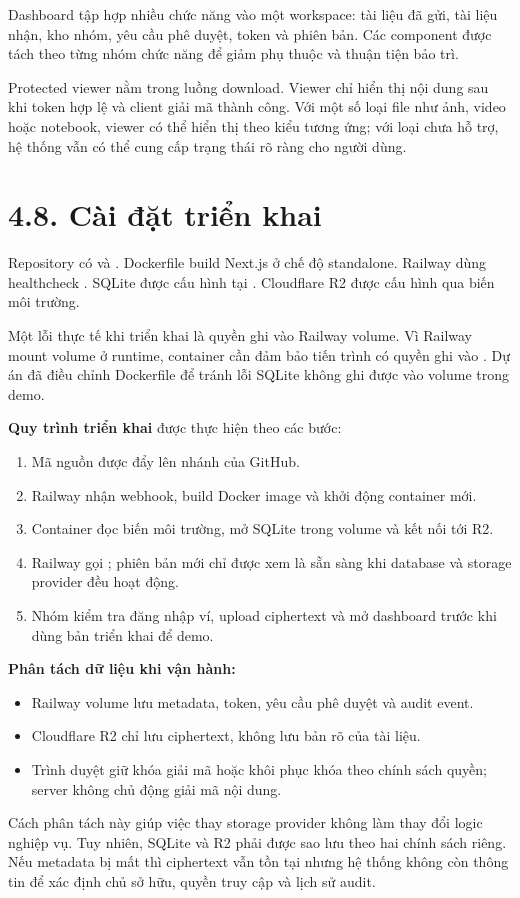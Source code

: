 Dashboard tập hợp nhiều chức năng vào một workspace: tài liệu đã gửi, tài liệu nhận, kho nhóm, yêu cầu phê duyệt, token và phiên bản. Các component được tách theo từng nhóm chức năng để giảm phụ thuộc và thuận tiện bảo trì.

Protected viewer nằm trong luồng download. Viewer chỉ hiển thị nội dung sau khi token hợp lệ và client giải mã thành công. Với một số loại file như ảnh, video hoặc notebook, viewer có thể hiển thị theo kiểu tương ứng; với loại chưa hỗ trợ, hệ thống vẫn có thể cung cấp trạng thái rõ ràng cho người dùng.

\section*{4.8. Cài đặt triển khai}
{}

Repository có  và . Dockerfile build Next.js ở chế độ standalone. Railway dùng healthcheck . SQLite được cấu hình tại . Cloudflare R2 được cấu hình qua biến môi trường.

Một lỗi thực tế khi triển khai là quyền ghi vào Railway volume. Vì Railway mount volume ở runtime, container cần đảm bảo tiến trình có quyền ghi vào . Dự án đã điều chỉnh Dockerfile để tránh lỗi SQLite không ghi được vào volume trong demo.

\textbf{Quy trình triển khai} được thực hiện theo các bước:
\begin{enumerate}
  \item Mã nguồn được đẩy lên nhánh  của GitHub.
  \item Railway nhận webhook, build Docker image và khởi động container mới.
  \item Container đọc biến môi trường, mở SQLite trong volume và kết nối tới R2.
  \item Railway gọi ; phiên bản mới chỉ được xem là sẵn sàng khi database và storage provider đều hoạt động.
  \item Nhóm kiểm tra đăng nhập ví, upload ciphertext và mở dashboard trước khi dùng bản triển khai để demo.
\end{enumerate}

\textbf{Phân tách dữ liệu khi vận hành:}
\begin{itemize}
  \item Railway volume lưu metadata, token, yêu cầu phê duyệt và audit event.
  \item Cloudflare R2 chỉ lưu ciphertext, không lưu bản rõ của tài liệu.
  \item Trình duyệt giữ khóa giải mã hoặc khôi phục khóa theo chính sách quyền; server không chủ động giải mã nội dung.
\end{itemize}

Cách phân tách này giúp việc thay storage provider không làm thay đổi logic nghiệp vụ. Tuy nhiên, SQLite và R2 phải được sao lưu theo hai chính sách riêng. Nếu metadata bị mất thì ciphertext vẫn tồn tại nhưng hệ thống không còn thông tin để xác định chủ sở hữu, quyền truy cập và lịch sử audit.

\clearpage
